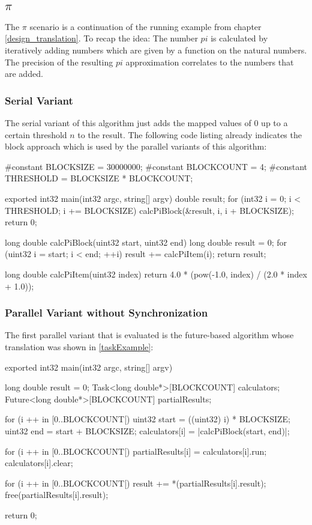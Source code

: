\subsection{$\pi$}
The $\pi$ scenario is a continuation of the running example from chapter \ref{design_translation}. To recap the idea: The number $pi$ is calculated by iteratively adding numbers which are given by a function on the natural numbers. The precision of the resulting $pi$ approximation correlates to the numbers that are added. 

\subsubsection{Serial Variant}
The serial variant of this algorithm just adds the mapped values of $0$ up to a certain threshold $n$ to the result. The following code listing already indicates the block approach which is used by the parallel variants of this algorithm:

\begin{ccode}
#constant BLOCKSIZE = 30000000; 
#constant BLOCKCOUNT = 4; 
#constant THRESHOLD = BLOCKSIZE * BLOCKCOUNT;

exported int32 main(int32 argc, string[] argv) { 
  double result;   
  for (int32 i = 0; i < THRESHOLD; i += BLOCKSIZE) { 
    calcPiBlock(&result, i, i + BLOCKSIZE); 
  }   
  return 0; 
}

long double calcPiBlock(uint32 start, uint32 end) { 
  long double result = 0; 
  for (uint32 i = start; i < end; ++i) { 
    result += calcPiItem(i); 
  }
  return result; 
}
 
long double calcPiItem(uint32 index) { 
  return 4.0 * (pow(-1.0, index) / (2.0 * index + 1.0)); 
}
\end{ccode}

\subsubsection{Parallel Variant without Synchronization}
The first parallel variant that is evaluated is the future-based algorithm whose translation was shown in \ref{taskExample}:
\begin{ccode}
exported int32 main(int32 argc, string[] argv) { 
  long double result = 0; 
  Task<long double*>[BLOCKCOUNT] calculators; 
  Future<long double*>[BLOCKCOUNT] partialResults; 
   
  for (i ++ in [0..BLOCKCOUNT[) { 
    uint32 start = ((uint32) i) * BLOCKSIZE; 
    uint32 end = start + BLOCKSIZE; 
    calculators[i] = |calcPiBlock(start, end)|; 
  }
   
  for (i ++ in [0..BLOCKCOUNT[) { 
    partialResults[i] = calculators[i].run; 
    calculators[i].clear; 
  }
   
  for (i ++ in [0..BLOCKCOUNT[) { 
    result += *(partialResults[i].result); 
    free(partialResults[i].result); 
  }
   
  return 0; 
}
\end{ccode}


